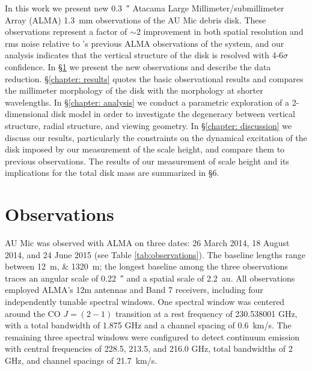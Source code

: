 \documentclass[12pt,oneside]{book}
\begin{document}
In this work we present new \SI{0.3}{\arcsecond} Atacama Large Millimeter/submillimeter Array \newline (ALMA) \SI{1.3}{mm} observations of the AU Mic debris disk. 
These observations represent a factor of $\sim 2$ improvement in both spatial resolution and rms noise relative to \cite{macgregor13}'s previous ALMA observations of the system, and our analysis indicates that the vertical structure of the disk is resolved with 4-6$\sigma$ confidence.
In \S \ref{chapter: observations} we present the new observations and describe the data reduction.  
\S \ref{chapter: results} quotes the basic observational results and compares the millimeter morphology of the disk with the morphology at shorter wavelengths.  
In \S \ref{chapter: analysis} we conduct a parametric exploration of a 2-dimensional disk model in order to investigate the degeneracy between vertical structure, radial structure, and viewing geometry.
In \S \ref{chapter: discussion} we discuss our results, particularly the constraints on the dynamical excitation of the disk imposed by our measurement of the scale height, and compare them to previous observations.
The results of our measurement of scale height and its implications for the total disk mass are summarized in \S 6.

\clearpage

\chapter{Observations}
\label{chapter: observations}
AU Mic was observed  with ALMA on three dates: 26 March 2014, 18 August 2014, and 24 June 2015 (see Table \ref{tab:observations}). 
The baseline lengths range between \SIlist{12;1320}{m}; the longest baseline among the three observations traces an angular scale of \SI{0.22}{\arcsecond} and a spatial scale of \SI{2.2}{au}.
All observations employed ALMA's 12m antennas and Band 7 receivers, including four independently tunable spectral windows. 
One spectral window was centered around the CO $J = (2-1)$ transition at a rest frequency of 230.538001 GHz, with a total bandwidth of 1.875 GHz and a channel spacing of \SI{0.6}{km/s}.
The remaining three spectral windows were configured to detect continuum emission with central frequencies of 228.5, 213.5, and 216.0 GHz, total bandwidths of 2 GHz, and channel spacings of \SI{21.7}{km/s}.
\end{document}
